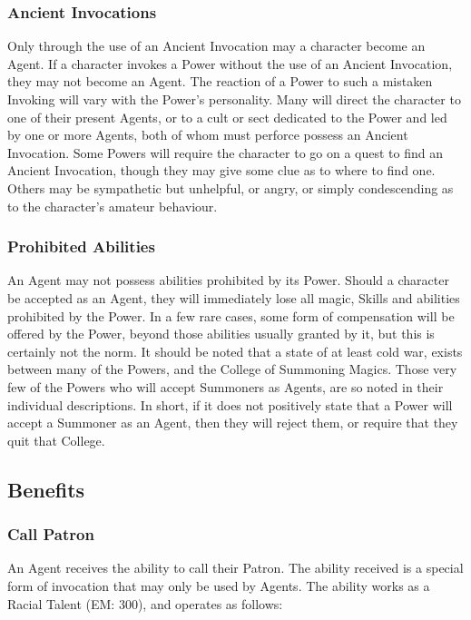 \subsubsection{Ancient Invocations}

Only through the use of an Ancient Invocation may a character become
an Agent.  If a character invokes a Power without the use of an
Ancient Invocation, they may not become an Agent.  The reaction of a
Power to such a mistaken Invoking will vary with the Power's
personality.  Many will direct the character to one of their present
Agents, or to a cult or sect dedicated to the Power and led by one or
more Agents, both of whom must perforce possess an Ancient Invocation.
Some Powers will require the character to go on a quest to find an
Ancient Invocation, though they may give some clue as to where to find
one. Others may be sympathetic but unhelpful, or angry, or simply
condescending as to the character's amateur behaviour.

\subsubsection{Prohibited Abilities}

An Agent may not possess abilities prohibited by its Power.  Should a
character be accepted as an Agent, they will immediately lose all
magic, Skills and abilities prohibited by the Power.  In a few rare
cases, some form of compensation will be offered by the Power, beyond
those abilities usually granted by it, but this is certainly not the
norm.  It should be noted that a state of at least cold war, exists
between many of the Powers, and the College of Summoning Magics.
Those very few of the Powers who will accept Summoners as Agents, are
so noted in their individual descriptions.  In short, if it does not
positively state that a Power will accept a Summoner as an Agent, then
they will reject them, or require that they quit that College.

\subsection{Benefits}

\subsubsection{Call Patron}

An Agent receives the ability to call their Patron. The ability
received is a special form of invocation that may only be used by
Agents.  The ability works as a Racial Talent (EM: 300), and operates
as follows:

